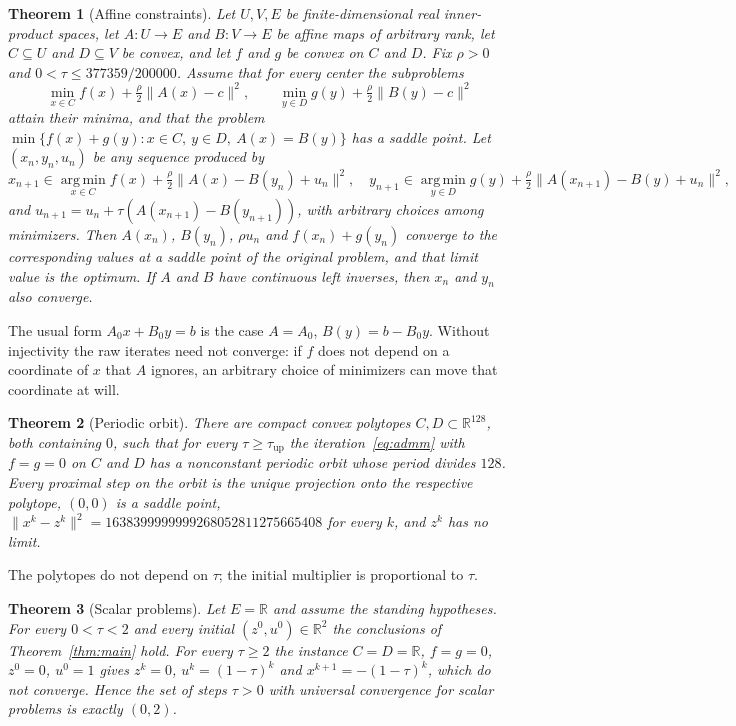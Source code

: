 \documentclass[11pt]{article}
\numberwithin{equation}{section}
\newtheorem{theorem}{Theorem}[section]
\theoremstyle{definition}
\theoremstyle{remark}
\newcommand{\R}{\mathbb R}
\newcommand{\norm}[1]{\lVert #1\rVert}
\newcommand{\taunew}{377359/200000}
\newcommand{\tauup}{\tau_{\mathrm{up}}}
\begin{document}
\begin{theorem}[Affine constraints]\label{thm:affine}
Let $U,V,E$ be finite-dimensional real inner-product spaces, let $A:U\to E$ and $B:V\to E$ be affine maps of arbitrary rank, let $C\subseteq U$ and $D\subseteq V$ be convex, and let $f$ and $g$ be convex on $C$ and $D$. Fix $\rho>0$ and $0<\tau\le\taunew$. Assume that for every center the subproblems
\[
\min_{x\in C} f(x)+\tfrac\rho2\norm{A(x)-c}^2,\qquad \min_{y\in D} g(y)+\tfrac\rho2\norm{B(y)-c}^2
\]
attain their minima, and that the problem $\min\{f(x)+g(y):x\in C,\ y\in D,\ A(x)=B(y)\}$ has a saddle point. Let $(x_n,y_n,u_n)$ be any sequence produced by
\[
x_{n+1}\in\operatorname*{arg\,min}_{x\in C} f(x)+\tfrac\rho2\norm{A(x)-B(y_n)+u_n}^2,\quad
y_{n+1}\in\operatorname*{arg\,min}_{y\in D} g(y)+\tfrac\rho2\norm{A(x_{n+1})-B(y)+u_n}^2,
\]
and $u_{n+1}=u_n+\tau(A(x_{n+1})-B(y_{n+1}))$, with arbitrary choices among minimizers. Then $A(x_n)$, $B(y_n)$, $\rho u_n$ and $f(x_n)+g(y_n)$ converge to the corresponding values at a saddle point of the original problem, and that limit value is the optimum. If $A$ and $B$ have continuous left inverses, then $x_n$ and $y_n$ also converge.
\end{theorem}
The usual form $A_0x+B_0y=b$ is the case $A=A_0$, $B(y)=b-B_0y$. Without injectivity the raw iterates need not converge: if $f$ does not depend on a coordinate of $x$ that $A$ ignores, an arbitrary choice of minimizers can move that coordinate at will.

\begin{theorem}[Periodic orbit]\label{thm:cycle}
There are compact convex polytopes $C,D\subset\R^{128}$, both containing $0$, such that for every $\tau\ge\tauup$ the iteration~\eqref{eq:admm} with $f=g=0$ on $C$ and $D$ has a nonconstant periodic orbit whose period divides $128$. Every proximal step on the orbit is the unique projection onto the respective polytope, $(0,0)$ is a saddle point, $\norm{x^k-z^k}^2=1638399999999268052811275665408$ for every $k$, and $z^k$ has no limit.
\end{theorem}
The polytopes do not depend on $\tau$; the initial multiplier is proportional to $\tau$.

\begin{theorem}[Scalar problems]\label{thm:scalar}
Let $E=\R$ and assume the standing hypotheses. For every $0<\tau<2$ and every initial $(z^0,u^0)\in\R^2$ the conclusions of Theorem~\ref{thm:main} hold. For every $\tau\ge2$ the instance $C=D=\R$, $f=g=0$, $z^0=0$, $u^0=1$ gives $z^k=0$, $u^k=(1-\tau)^k$ and $x^{k+1}=-(1-\tau)^k$, which do not converge. Hence the set of steps $\tau>0$ with universal convergence for scalar problems is exactly $(0,2)$.
\end{theorem}
\end{document}
